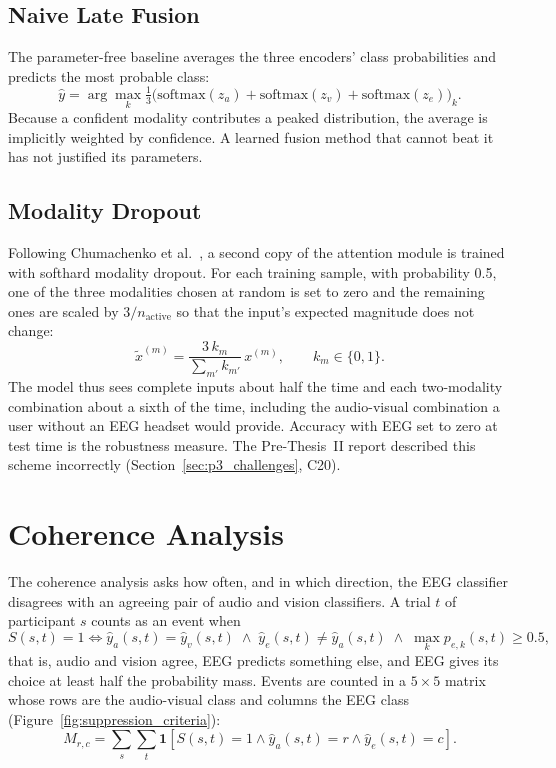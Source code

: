 \subsection{Naive Late Fusion}
\label{sec:naive_method}
The parameter-free baseline averages the three encoders' class probabilities and predicts the most probable class:
\begin{equation}
    \hat{y} = \arg\max_k \tfrac{1}{3}\big(\mathrm{softmax}(z_a) + \mathrm{softmax}(z_v) + \mathrm{softmax}(z_e)\big)_k .
\end{equation}
Because a confident modality contributes a peaked distribution, the average is implicitly weighted by confidence. A learned fusion method that cannot beat it has not justified its parameters.

\subsection{Modality Dropout}
\label{sec:modality_dropout}
Following Chumachenko et al.\ \cite{Chumachenko2022SelfAttention}, a second copy of the attention module is trained with softhard modality dropout. For each training sample, with probability 0.5, one of the three modalities chosen at random is set to zero and the remaining ones are scaled by $3/n_{\mathrm{active}}$ so that the input's expected magnitude does not change:
\begin{equation}
  \tilde{x}^{(m)} = \frac{3\, k_m}{\sum_{m'} k_{m'}}\, x^{(m)}, \qquad k_m \in \{0, 1\}.
\end{equation}
The model thus sees complete inputs about half the time and each two-modality combination about a sixth of the time, including the audio-visual combination a user without an EEG headset would provide. Accuracy with EEG set to zero at test time is the robustness measure. The Pre-Thesis~II report described this scheme incorrectly (Section~\ref{sec:p3_challenges}, C20).

\section{Coherence Analysis}
\label{sec:coherence_analysis}
The coherence analysis asks how often, and in which direction, the EEG classifier disagrees with an agreeing pair of audio and vision classifiers. A trial $t$ of participant $s$ counts as an event when
\begin{equation}
S(s,t)=1 \Longleftrightarrow
\hat{y}_{a}(s,t)=\hat{y}_{v}(s,t) \;\land\; \hat{y}_{e}(s,t)\neq\hat{y}_{a}(s,t) \;\land\; \max_k p_{e,k}(s,t)\geq0.5,
\end{equation}
that is, audio and vision agree, EEG predicts something else, and EEG gives its choice at least half the probability mass. Events are counted in a $5\times5$ matrix whose rows are the audio-visual class and columns the EEG class (Figure~\ref{fig:suppression_criteria}):
\begin{equation}
    M_{r,c}=\sum_{s}\sum_{t}\mathbf{1}\left[S(s,t)=1 \land \hat{y}_{a}(s,t)=r \land \hat{y}_{e}(s,t)=c\right].
\end{equation}

